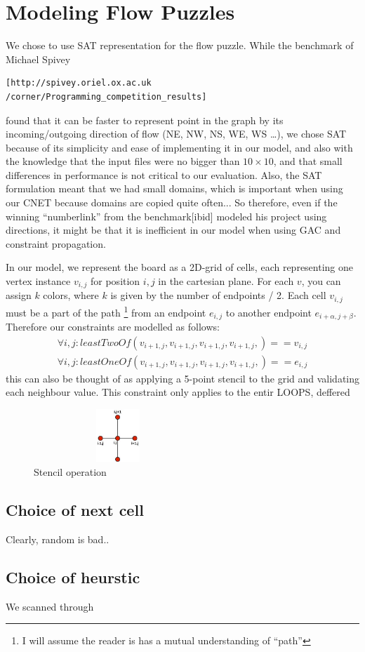 \documentclass[journal]{IEEEtran}
\begin{document}
\section*{Modeling Flow Puzzles}
We chose to use SAT representation for the flow puzzle. 
While the benchmark of Michael Spivey 
\small\begin{verbatim}
[http://spivey.oriel.ox.ac.uk
/corner/Programming_competition_results]\end{verbatim}
\normalsize
found that it can be faster to represent point in the graph by its
incoming/outgoing direction of flow (NE, NW, NS, WE, WS \dots), 
we chose SAT because of its simplicity and ease of implementing it in our
model, and also with the knowledge that the input files were no bigger than
$10 \times 10$, and that small differences in performance is not critical to our evaluation.
Also, the SAT formulation meant that we had small domains, which is important
when using our CNET because domains are copied quite often... So therefore, 
even if the winning ``numberlink'' from the benchmark[ibid] modeled 
his project using directions, it might be that it is inefficient in 
our model when using GAC and constraint propagation.

In our model, we represent the board as a 2D-grid of cells, each representing one
vertex instance $v_{i,j}$ for position $i,j$ in the cartesian plane.
For each $v$, you can assign $k$ colors, where $k$ is given by
the number of endpoints / 2. 
Each cell $v_{i,j}$ must be a part of the path
\footnote{I will assume the reader is has a mutual understanding of ``path''}
from an endpoint $e_{i,j}$ to another endpoint $e_{i+\alpha,j+\beta}$.
Therefore our constraints are modelled as follows:
\begin{align}
    \forall{i,j}: leastTwoOf( v_{i+1,j},v_{i+1,j},v_{i+1,j},v_{i+1,j}, ) == v_{i,j} \\   %
    \forall{i,j}: leastOneOf( v_{i+1,j},v_{i+1,j},v_{i+1,j},v_{i+1,j}, ) == e_{i,j}
\end{align}
this can also be thought of as applying a 5-point stencil to the grid
and validating each neighbour value. This constraint only applies to the entir
LOOPS, deffered

\begin{figure}[Hb]
\centering
    \includegraphics[height=2cm,keepaspectratio,width=2.5in]{stencil.jpg}
\caption{Stencil operation}
\label{fig:stencil}
\end{figure}

\subsection{Choice of next cell}
Clearly, random is bad..

\subsection{Choice of heurstic}
We scanned through 
\end{document}
